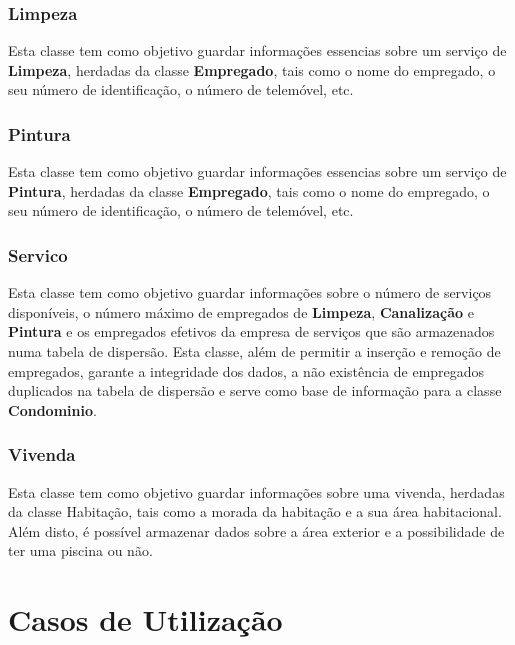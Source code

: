 \documentclass[a4paper]{article}
\begin{document}
\subsubsection{Limpeza}

Esta classe tem como objetivo guardar informações essencias sobre um serviço de \textbf{Limpeza}, herdadas da classe \textbf{Empregado}, tais como o nome do empregado, o seu número de identificação, o número de telemóvel, etc.

\subsubsection{Pintura}

Esta classe tem como objetivo guardar informações essencias sobre um serviço de \textbf{Pintura}, herdadas da classe \textbf{Empregado}, tais como o nome do empregado, o seu número de identificação, o número de telemóvel, etc.

\subsubsection{Servico}

Esta classe tem como objetivo guardar informações sobre o número de serviços disponíveis, o número máximo de empregados de \textbf{Limpeza}, \textbf{Canalização} e \textbf{Pintura} e os empregados efetivos da empresa de serviços que são armazenados numa tabela de dispersão. Esta classe, além de permitir a inserção e remoção de empregados, garante a integridade dos dados, a não existência de empregados duplicados na tabela de dispersão e serve como base de informação para a classe \textbf{Condominio}. 

\subsubsection{Vivenda}

Esta classe tem como objetivo guardar informações sobre uma vivenda, herdadas da classe Habitação, tais como a morada da habitação e a sua área habitacional. Além disto, é possível armazenar dados sobre a área exterior e a possibilidade de ter uma piscina ou não.

\newpage

\section{Casos de Utilização}
\end{document}
